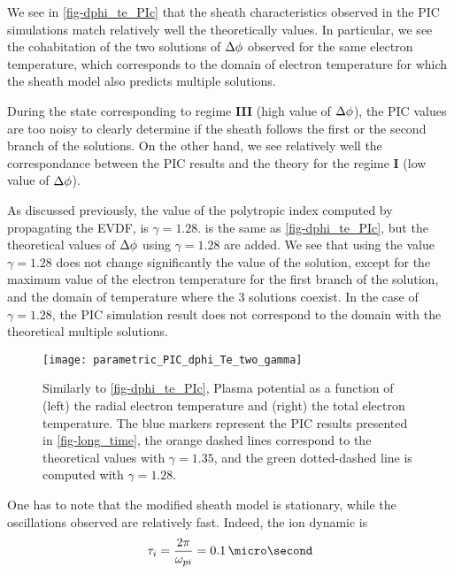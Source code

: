     We see in \cref{fig-dphi_te_PIc} that the sheath characteristics observed in the \ac{PIC}  simulations match relatively well the theoretically values.
    In particular, we see the cohabitation of the two solutions of $\Delta \phi$ observed for the same electron temperature, which corresponds to the domain of electron temperature for which the sheath model also predicts multiple solutions.
    
    During the state corresponding to regime {\bf III} (high value of  $\Delta \phi$), the \ac{PIC} values are too noisy to clearly determine if the sheath follows the first or the second branch of the solutions.
    On the other hand, we see relatively well the correspondance between the \ac{PIC} results and the theory for the regime {\bf I} (low value of $\Delta \phi$).
    
    As discussed previously, the value of the polytropic index computed by propagating the \ac{EVDF}, is $\gamma=1.28$.
     is the same as \cref{fig-dphi_te_PIc}, but  the theoretical values of $\Delta \phi$ using $\gamma=1.28$ are added.
    We see that using the value $\gamma=1.28$ does not change significantly the value of the solution, except for the maximum value of the electron temperature for the first branch of the solution, and the domain of temperature where the 3 solutions coexist.
    In the case of $\gamma=1.28$, the \ac{PIC} simulation result does not correspond to the domain with the theoretical multiple solutions.
    \begin{figure}[hbtp]
      \centering
      \texttt{[image: parametric\_PIC\_dphi\_Te\_two\_gamma]}
      \caption{Similarly to \cref{fig-dphi_te_PIc}, Plasma potential as a function of (left) the radial electron temperature and (right) the total electron temperature. The blue markers represent the \ac{PIC} results presented in \cref{fig-long_time}, the orange dashed lines correspond to the theoretical values with $\gamma=1.35$, and the green dotted-dashed line is computed with $\gamma=1.28$.}
      \label{fig-dphi_te_PIc2}
    \end{figure}
    
    One has to note that the modified sheath model is stationary, while the oscillations observed are relatively fast.
    Indeed, the ion dynamic is 
    \begin{equation} \label{eq-ti}
      \tau_i = \frac{2 \pi}{\opi} = 0.1 \,\micro\second
    \end{equation}
    
